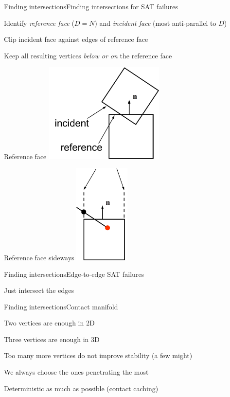 \documentclass{beamer}
\begin{document}
\begin{slide}{Finding intersections}{Finding intersections for SAT failures}{
\item Identify \textit{reference face} ($D=N$) and \textit{incident face} (most anti-parallel to $D$)
\item Clip incident face against edges of reference face
\item Keep all resulting vertices \textit{below or on} the reference face
}\end{slide}

\begin{frame}{Reference face}
\center
\includegraphics[height=5cm]{Pics/ReferenceFace.png}
\end{frame}

\begin{frame}{Reference face sideways}
\center
\includegraphics[height=5cm]{Pics/ReferenceFaceSideways.png}
\end{frame}

\begin{slide}{Finding intersections}{Edge-to-edge SAT failures}{
\item Just intersect the edges
}\end{slide}

\begin{slide}{Finding intersections}{Contact manifold}{
\item Two vertices are enough in 2D
\item Three vertices are enough in 3D
\item Too many more vertices do not improve stability (a few might)
\item We always choose the ones penetrating the most
\item Deterministic as much as possible (contact caching)
}\end{slide}
\end{document}

